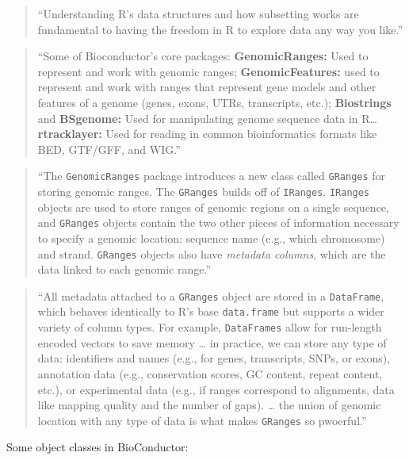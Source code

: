 \documentclass[]{tufte-book}
\begin{document}
\begin{quote}
``Understanding R's data structures and how subsetting works are fundamental to
having the freedom in R to explore data any way you like.'' \citep{buffalo2015bioinformatics}
\end{quote}

\begin{quote}
``Some of Bioconductor's core packages: \textbf{GenomicRanges:} Used to represent and
work with genomic ranges; \textbf{GenomicFeatures:} used to represent and work with ranges
that represent gene models and other features of a genome (genes, exons, UTRs,
transcripts, etc.); \textbf{Biostrings} and \textbf{BSgenome:} Used for manipulating genome
sequence data in R\ldots{} \textbf{rtracklayer:} Used for reading in common bioinformatics formats
like BED, GTF/GFF, and WIG.'' \citep{buffalo2015bioinformatics}
\end{quote}

\begin{quote}
``The \texttt{GenomicRanges} package introduces a new class called \texttt{GRanges} for storing
genomic ranges. The \texttt{GRanges} builds off of \texttt{IRanges}. \texttt{IRanges} objects are used
to store ranges of genomic regions on a single sequence, and \texttt{GRanges} objects contain
the two other pieces of information necessary to specify a genomic location:
sequence name (e.g., which chromosome) and strand. \texttt{GRanges} objects also have
\emph{metadata columns}, which are the data linked to each genomic range.''
\citep{buffalo2015bioinformatics}
\end{quote}

\begin{quote}
``All metadata attached to a \texttt{GRanges} object are stored in a \texttt{DataFrame}, which
behaves identically to R's base \texttt{data.frame} but supports a wider variety of
column types. For example, \texttt{DataFrames} allow for run-length encoded vectors
to save memory \ldots{} in practice, we can store any type of data: identifiers
and names (e.g., for genes, transcripts, SNPs, or exons), annotation data
(e.g., conservation scores, GC content, repeat content, etc.), or experimental
data (e.g., if ranges correspond to alignments, data like mapping quality and the
number of gaps). \ldots{} the union of genomic location with any type of data is what makes
\texttt{GRanges} so pwoerful.'' \citep{buffalo2015bioinformatics}
\end{quote}

Some object classes in BioConductor:
\end{document}
